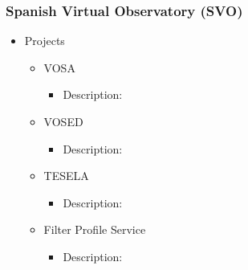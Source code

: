 \documentclass[11pt]{article}
\begin{document}
              \subsubsection{Spanish Virtual Observatory (SVO)}
                  \begin{itemize}
                      \item Projects
                          \begin{itemize}
                              \item VOSA
                                  \begin{itemize}
                                      \item Description: 
                                  \end{itemize}
                              \item VOSED
                                  \begin{itemize}
                                      \item Description: 
                                  \end{itemize}
                              \item TESELA
                                  \begin{itemize}
                                      \item Description: 
                                  \end{itemize}
                              \item Filter Profile Service
                                  \begin{itemize}
                                      \item Description: 
                                  \end{itemize}
                          \end{itemize}
                  \end{itemize}
\end{document}
